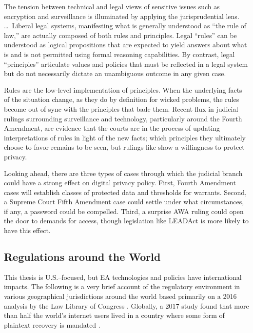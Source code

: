 \begin{displayquote}
The tension between technical and legal views of sensitive issues such as encryption and surveillance is illuminated by
applying the jurisprudential lens. \dots~Liberal legal systems, manifesting what is generally understood as ``the rule
of law,'' are actually composed of both rules and principles. Legal ``rules'' can be understood as logical propositions
that are expected to yield answers about what is and is not permitted using formal reasoning capabilities. By contrast,
legal ``principles'' articulate values and policies that must be reflected in a legal system but do not necessarily
dictate an unambiguous outcome in any given case.
\end{displayquote}

Rules are the low-level implementation of principles. When the underlying facts of the situation change, as they do by
definition for wicked problems, the rules become out of sync with the principles that bade them. Recent flux in judicial
rulings surrounding surveillance and technology, particularly around the Fourth Amendment, are evidence that the courts
are in the process of updating interpretations of rules in light of the new facts; which principles they ultimately
choose to favor remains to be seen, but rulings like  show a willingness to protect privacy.

Looking ahead, there are three types of cases through which the judicial branch could have a strong effect on digital
privacy policy. First, Fourth Amendment cases will establish classes of protected data and thresholds for warrants.
Second, a Supreme Court Fifth Amendment case could settle under what circumstances, if any, a password could be
compelled. Third, a surprise \ac{AWA} ruling could open the door to demands for access, though legislation like
\ac{LEADAct} is more likely to have this effect.


\subsection{Regulations around the World}
\label{sec-world-regs}

This thesis is U.S.--focused, but \ac{EA} technologies and policies have international impacts. The following is a very
brief account of the regulatory environment in various geographical jurisdictions around the world based primarily on a
2016 analysis by the Law Library of Congress \cite{acosta_government_2016}. Globally, a 2017 study found that more than
half the world's internet users lived in a country where some form of plaintext recovery is mandated \cite{lewis_2017}.

